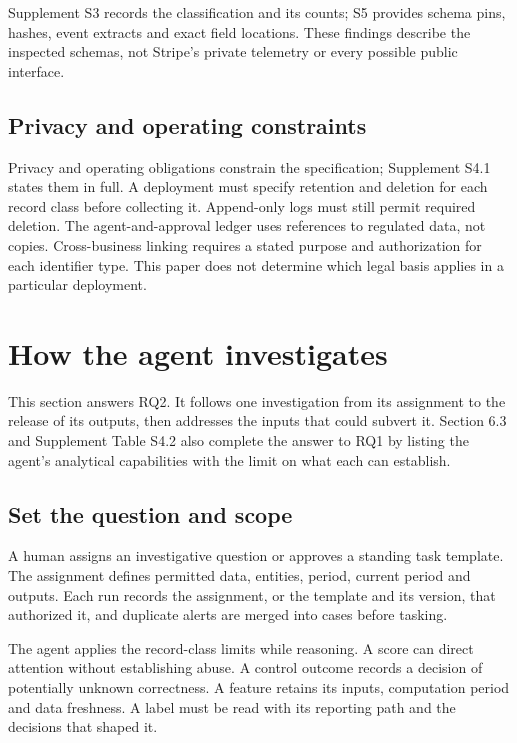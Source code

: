 \documentclass[acmlarge,review,anonymous,nonacm]{acmart}
\begin{document}
Supplement S3 records the classification and its counts; S5 provides
schema pins, hashes, event extracts and exact field locations. These
findings describe the inspected schemas, not Stripe's private telemetry
or every possible public interface.

\hypertarget{privacy-and-operating-constraints}{%
\subsection{Privacy and operating
constraints}\label{privacy-and-operating-constraints}}

Privacy and operating obligations constrain the specification;
Supplement S4.1 states them in full. A deployment must specify retention
and deletion for each record class before collecting it. Append-only
logs must still permit required deletion. The agent-and-approval ledger
uses references to regulated data, not copies. Cross-business linking
requires a stated purpose and authorization for each identifier type.
This paper does not determine which legal basis applies in a particular
deployment.

\hypertarget{how-the-agent-investigates}{%
\section{How the agent investigates}\label{how-the-agent-investigates}}

This section answers RQ2. It follows one investigation from its
assignment to the release of its outputs, then addresses the inputs that
could subvert it. Section 6.3 and Supplement Table S4.2 also complete
the answer to RQ1 by listing the agent's analytical capabilities with
the limit on what each can establish.

\hypertarget{set-the-question-and-scope}{%
\subsection{Set the question and
scope}\label{set-the-question-and-scope}}

A human assigns an investigative question or approves a standing task
template. The assignment defines permitted data, entities, period,
current period and outputs. Each run records the assignment, or the
template and its version, that authorized it, and duplicate alerts are
merged into cases before tasking.

The agent applies the record-class limits while reasoning. A score can
direct attention without establishing abuse. A control outcome records a
decision of potentially unknown correctness. A feature retains its
inputs, computation period and data freshness. A label must be read with
its reporting path and the decisions that shaped it.
\end{document}
